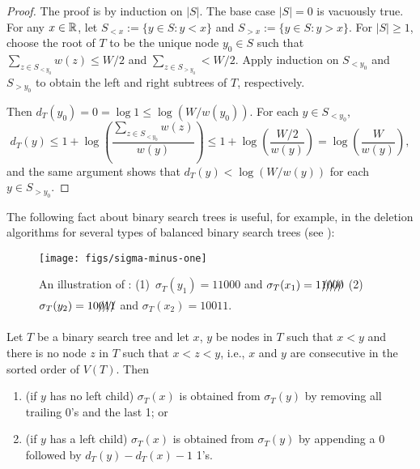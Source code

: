 \documentclass[kpfonts]{patmorin}
\newcommand{\snote}[1]{\fcolorbox{red}{yellow}{#1}}
\let\le\leqslant
\let\ge\geqslant
\begin{document}
\begin{proof}
  The proof is by induction on $|S|$. The base case $|S|=0$ is vacuously true.
  For any $x\in\mathbb{R}$, let $S_{<x}:=\{y\in S: y < x\}$ and $S_{>x}:=\{y\in S: y>x\}$. For $|S|\ge 1$, choose the root of $T$ to be the unique node $y_0\in S$ such that $\sum_{z\in S_{<y_0}} w(z)\le W/2$ and $\sum_{z\in S_{>y_0}}< W/2$. Apply induction on $S_{<y_0}$ and $S_{>y_0}$ to obtain the left and right subtrees of $T$, respectively.
  
  Then $d_T(y_0)=0=\log 1\le \log (W/w(y_0))$.  For each $y\in S_{<y_0}$, 
  \[ 
    d_T(y) \le 1 + \log\left(\frac{\sum_{z\in S_{<y_0}}w(z)}{w(y)}\right) 
            \le 1 + \log \left(\frac{W/2}{w(y)}\right) 
            = \log \left(\frac{W}{w(y)}\right) , 
  \]
  and the same argument shows that $d_T(y) < \log (W/w(y))$ for each $y\in S_{>y_0}$.  
\end{proof}

The following fact about binary search trees is useful, for example, in the deletion algorithms for several types of balanced binary search trees \cite[Section~6.2.3]{morin:open} (see ):

\begin{figure}
  \begin{center}
    \texttt{[image: figs/sigma-minus-one]}
  \end{center}
  \caption{An illustration of : (1)~$\sigma_T(y_1)=11000$ and $\sigma_T(x_1)=1\xout{1000}$ (2)~$\sigma_T(y_2)=10\xout{011}$ and $\sigma_T(x_2)=10011$.}
\end{figure}

\begin{obs}
  Let $T$ be a binary search tree and let $x$, $y$ be nodes in $T$ such that $x<y$ and there is no node $z$ in $T$ such that $x<z<y$, i.e., $x$ and $y$ are consecutive in the sorted order of $V(T)$.  Then
  \begin{enumerate}
    \item (if $y$ has no left child) $\sigma_T(x)$ is obtained from $\sigma_T(y)$ by removing all trailing 0's and the last 1; or
    \item (if $y$ has a left child) $\sigma_T(x)$ is obtained from $\sigma_T(y)$ by appending a 0 followed by $d_T(y)-d_T(x)-1$ 1's.
  \end{enumerate}
\end{obs}

\end{document}
